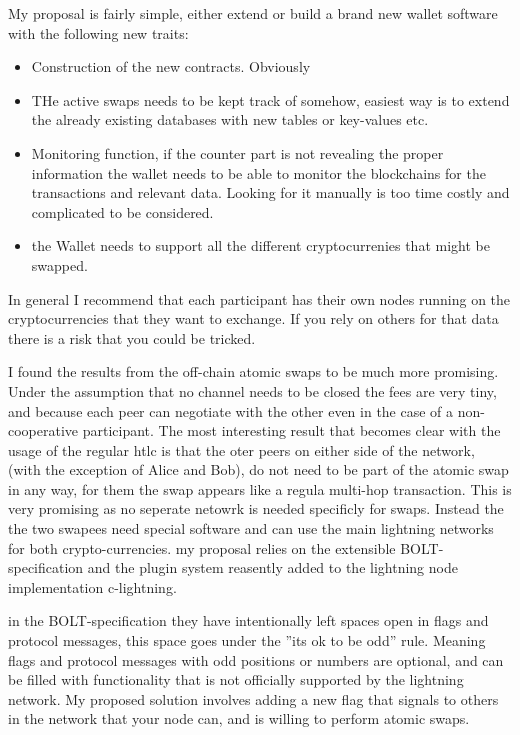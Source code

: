 My proposal is fairly simple, either extend or build a brand new wallet software 
with the following new traits:
\begin{itemize}
\item Construction of the new contracts. Obviously
\item THe active swaps needs to be kept track of somehow, easiest way is to extend the already existing databases with new tables or key-values etc.
\item Monitoring function, if the counter part is not revealing the proper information the wallet needs to be able to monitor the blockchains for the transactions and relevant data. Looking for it manually is too time costly and complicated to be considered.
\item the Wallet needs to support all the different cryptocurrenies that might be swapped. 
\end{itemize}

In general I recommend that each participant has their own nodes running on the cryptocurrencies that they want to exchange. If you rely on others for that data there is a risk that you could be tricked. 

I found the results from the off-chain atomic swaps to be much more promising. Under the assumption that no channel needs to be closed the fees are very tiny, and because each peer can negotiate with the other even in the case of a non-cooperative participant. The most interesting result that becomes clear with the usage of the regular htlc is that the oter peers on either side of the network, (with the exception of Alice and Bob), do not need to be part of the atomic swap in any way, for them the swap appears like a regula multi-hop transaction. This is very promising as no seperate netowrk is needed specificly for swaps. Instead the the two swapees need special software and can use the main lightning networks for both crypto-currencies. my proposal relies on the extensible BOLT-specification and the plugin system reasently added to the lightning node implementation c-lightning. 

in the BOLT-specification they have intentionally left spaces open in flags and protocol messages, this space goes under the ''its ok to be odd'' rule. Meaning flags and protocol messages with odd positions or numbers are optional, and can be filled with functionality that is not officially supported by the lightning network. My proposed solution involves adding a new flag that signals to others in the network that your node can, and is willing to perform atomic swaps. 

